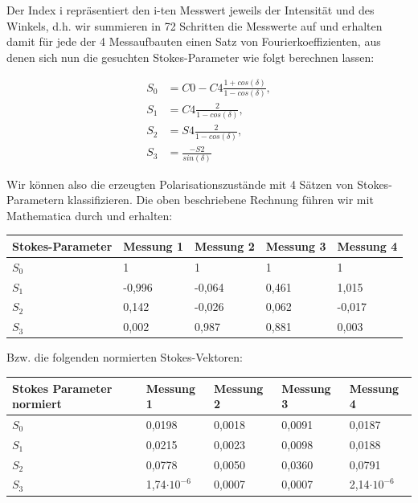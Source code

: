 \documentclass[bigchapter,colorback,accentcolor=tud4b,linedtoc,11pt]{tudreport}
\begin{document}
Der Index i repräsentiert den i-ten Messwert jeweils der Intensität und des Winkels, d.h. wir summieren in 72 Schritten die Messwerte auf und erhalten damit für jede der 4 Messaufbauten einen Satz von Fourierkoeffizienten, aus denen sich nun die gesuchten Stokes-Parameter wie folgt berechnen lassen: 

\begin{align*}
 S_0 &= C0 - C4 \frac{1 + cos(\delta)}{1 - cos(\delta)},\\ 
 S_1 &= C4 \frac{2}{1 - cos(\delta)},\\
 S_2 &= S4 \frac{2}{1 - cos(\delta)},\\
 S_3 &= \frac{-S2}{sin(\delta)} 
\end{align*}

Wir können also die erzeugten Polarisationszustände mit 4 Sätzen von Stokes-Parametern klassifizieren. Die oben beschriebene Rechnung führen wir mit Mathematica durch und erhalten: 

\begin{center}
  \begin{tabular}{|p{3cm}|p{3cm}|p{3cm}|p{3cm}|p{3cm}|}
    \hline
        Stokes-Parameter & Messung 1 & Messung 2 & Messung 3 & Messung 4 \\ \hline
        $S_0$ & 1 & 1 & 1 & 1 \\ \hline
        $S_1$ & -0,996 & -0,064 & 0,461 & 1,015 \\ \hline
        $S_2$ & 0,142 & -0,026 & 0,062 & -0,017 \\ \hline
        $S_3$ & 0,002 & 0,987 & 0,881 & 0,003 \\ \hline
\end{tabular}
\end{center}

Bzw. die folgenden normierten Stokes-Vektoren:

\begin{center}
  \begin{tabular}{|p{3cm}|p{3cm}|p{3cm}|p{3cm}|p{3cm}|}
    \hline
        Stokes Parameter normiert & Messung 1 & Messung 2 & Messung 3 & Messung 4 \\ \hline
        $S_0$ & 0,0198 & 0,0018 & 0,0091 & 0,0187 \\ \hline
        $S_1$ & 0,0215 & 0,0023 & 0,0098 & 0,0188 \\ \hline
        $S_2$ & 0,0778 & 0,0050 & 0,0360 & 0,0791 \\ \hline
        $S_3$ & 1,74$\cdot 10^{-6}$ & 0,0007 & 0,0007 & 2,14$\cdot 10^{-6}$ \\ \hline
\end{tabular}
\end{center}
\end{document}
